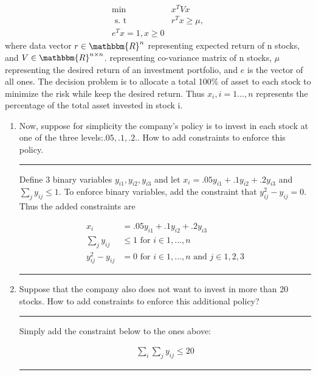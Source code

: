 \documentclass{article} %
\newcommand{\R}{\mathbbm{R}}
\begin{document}
\begin{equation*}
\begin{aligned}
\min & x^T V x \\ 
\mbox{ s. t} & r^Tx \geq \mu, \\ 
e^Tx = 1, x \geq0
\end{aligned}
\end{equation*}
where data vector $r \in \R^n$ representing expected return of n stocks, and $V \in \R^{n \times n}$.
representing co-variance matrix of n stocks, $\mu$ representing the desired return of an
investment portfolio, and $e$ is the vector of all ones. The decision problem is to allocate
a total 100$\%$ of asset to each stock to minimize the risk while keep the desired return.
Thus $x_i, i = 1 \hdots, n$  represents the percentage of the total asset invested in stock i.

\begin{enumerate}
\item Now, suppose for simplicity the company's policy is to invest in each stock at one of the three levels:$ .05, .1, .2. $. 
How to add constraints to enforce this policy. 
\rule{\textwidth}{1pt}

Define 3 binary variables $y_{i1}, y_{i2}, y_{i3}$ and let $x_i = .05 y_{i1} + .1 y_{i2} + .2 y_{i3}$ and $\sum_{j} y_{ij} \leq 1$.
To enforce binary variables, add the constraint that $y_{ij}^2 - y_{ij} = 0$. Thus the added constraints are 

\begin{equation*}
\begin{aligned}
x_i &= .05 y_{i1} + .1 y_{i2} + .2 y_{i3} \\ 
\sum_{j}y_{ij} &\leq 1 \mbox{  for } i \in 1, \hdots, n \\ 
y_{ij}^2 - y_{ij} &= 0 \mbox{ for } i \in 1, \hdots, n \mbox{ and } j \in 1, 2, 3
\end{aligned}
\end{equation*}
\rule{\textwidth}{1pt}
\item Suppose that the company also does not want to invest in more than 20 stocks.
How to add constraints to enforce this additional policy?

\rule{\textwidth}{1pt}

Simply add the constraint  below to the ones above:

\begin{gather*}
\sum_{i} \sum_{j} y_{ij} \leq 20 
\end{gather*}
\rule{\textwidth}{1pt}
\end{enumerate}
\end{document}
